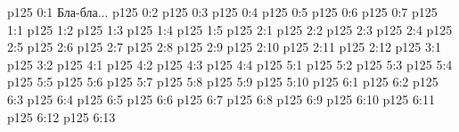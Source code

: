 \author{Промежуточные создания}
\vs p125 0:1  Бла-бла...
\vs p125 0:2 \pc 
\vs p125 0:3 
\vs p125 0:4 
\vs p125 0:5 
\vs p125 0:6 
\vs p125 0:7 
\vs p125 1:1 
\vs p125 1:2 
\vs p125 1:3 
\vs p125 1:4 
\vs p125 1:5 
\vs p125 2:1 
\vs p125 2:2 
\vs p125 2:3 
\vs p125 2:4 
\vs p125 2:5 
\vs p125 2:6 
\vs p125 2:7 
\vs p125 2:8 
\vs p125 2:9 
\vs p125 2:10 
\vs p125 2:11 
\vs p125 2:12 
\vs p125 3:1 
\vs p125 3:2 
\vs p125 4:1 
\vs p125 4:2 
\vs p125 4:3 
\vs p125 4:4 
\vs p125 5:1 
\vs p125 5:2 
\vs p125 5:3 
\vs p125 5:4 
\vs p125 5:5 
\vs p125 5:6 
\vs p125 5:7 
\vs p125 5:8 \pc 
\vs p125 5:9 \pc 
\vs p125 5:10 
\vs p125 6:1 
\vs p125 6:2 
\vs p125 6:3 
\vs p125 6:4 \pc 
\vs p125 6:5 
\vs p125 6:6 \pc 
\vs p125 6:7 
\vs p125 6:8 
\vs p125 6:9 
\vs p125 6:10 
\vs p125 6:11 
\vs p125 6:12 \pc 
\vs p125 6:13 \pc 
\quizlink
